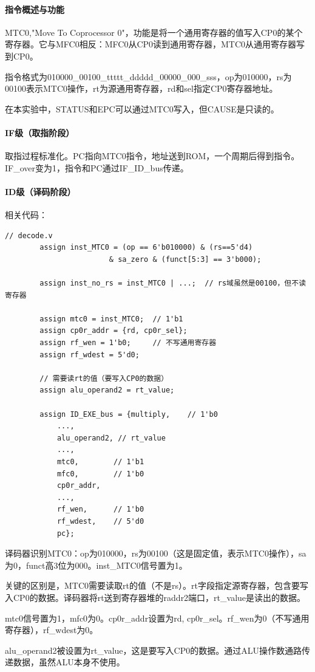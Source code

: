 \documentclass[a4paper]{article}
\begin{document}
	\paragraph{指令概述与功能}
	MTC0,"Move To Coprocessor 0"，功能是将一个通用寄存器的值写入CP0的某个寄存器。它与MFC0相反：MFC0从CP0读到通用寄存器，MTC0从通用寄存器写到CP0。
	
	指令格式为010000\_00100\_ttttt\_ddddd\_00000\_000\_sss，op为010000，rs为00100表示MTC0操作，rt为源通用寄存器，rd和sel指定CP0寄存器地址。
	
	在本实验中，STATUS和EPC可以通过MTC0写入，但CAUSE是只读的。
	\paragraph{IF级（取指阶段）}
	取指过程标准化。PC指向MTC0指令，地址送到ROM，一个周期后得到指令。IF\_over变为1，指令和PC通过IF\_ID\_bus传递。
	\paragraph{ID级（译码阶段）}
	相关代码：
	\begin{lstlisting}[caption={ID}]
		// decode.v
		assign inst_MTC0 = (op == 6'b010000) & (rs==5'd4)
						& sa_zero & (funct[5:3] == 3'b000);
		
		assign inst_no_rs = inst_MTC0 | ...;  // rs域虽然是00100，但不读寄存器
		
		assign mtc0 = inst_MTC0;  // 1'b1
		assign cp0r_addr = {rd, cp0r_sel};
		assign rf_wen = 1'b0;     // 不写通用寄存器
		assign rf_wdest = 5'd0;
		
		// 需要读rt的值（要写入CP0的数据）
		assign alu_operand2 = rt_value;
		
		assign ID_EXE_bus = {multiply,    // 1'b0
			...,
			alu_operand2, // rt_value
			...,
			mtc0,        // 1'b1
			mfc0,        // 1'b0
			cp0r_addr,
			...,
			rf_wen,      // 1'b0
			rf_wdest,    // 5'd0
			pc};
	\end{lstlisting}
	译码器识别MTC0：op为010000，rs为00100（这是固定值，表示MTC0操作），sa为0，funct高3位为000。inst\_MTC0信号置为1。
	
	关键的区别是，MTC0需要读取rt的值（不是rs）。rt字段指定源寄存器，包含要写入CP0的数据。译码器将rt送到寄存器堆的raddr2端口，rt\_value是读出的数据。
	
	mtc0信号置为1，mfc0为0。cp0r\_addr设置为{rd, cp0r\_sel}。rf\_wen为0（不写通用寄存器），rf\_wdest为0。
	
	alu\_operand2被设置为rt\_value，这是要写入CP0的数据。通过ALU操作数通路传递数据，虽然ALU本身不使用。
	
\end{document}
